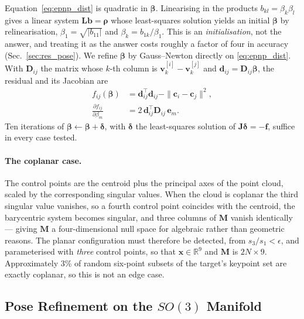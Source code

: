 Equation~\eqref{eq:epnp_dist} is quadratic in $\boldsymbol{\beta}$.
Linearising in the products $b_{kl} = \beta_k \beta_l$ gives a linear system
$\mathbf{L}\mathbf{b} = \boldsymbol{\rho}$ whose least-squares solution yields
an initial $\boldsymbol{\beta}$ by relinearisation,
$\beta_1 = \sqrt{|b_{11}|}$ and $\beta_k = b_{1k}/\beta_1$. This is an
\emph{initialisation}, not the answer, and treating it as the answer costs
roughly a factor of four in accuracy (Sec.~\ref{sec:res_pose}). We refine
$\boldsymbol{\beta}$ by Gauss--Newton directly on \eqref{eq:epnp_dist}. With
$\mathbf{D}_{ij}$ the matrix whose $k$-th column is
$\mathbf{v}_k^{[i]} - \mathbf{v}_k^{[j]}$ and
$\mathbf{d}_{ij} = \mathbf{D}_{ij}\boldsymbol{\beta}$, the residual and its
Jacobian are
\begin{align}
f_{ij}(\boldsymbol{\beta}) &= \mathbf{d}_{ij}^{\top}\mathbf{d}_{ij}
                              - \|\mathbf{c}_i - \mathbf{c}_j\|^2 ,
\label{eq:epnp_resid}\\
\frac{\partial f_{ij}}{\partial \beta_m}
  &= 2\, \mathbf{d}_{ij}^{\top} \mathbf{D}_{ij}\,\mathbf{e}_m .
\label{eq:epnp_jac}
\end{align}
Ten iterations of $\boldsymbol{\beta} \leftarrow \boldsymbol{\beta} +
\boldsymbol{\delta}$, with $\boldsymbol{\delta}$ the least-squares solution of
$\mathbf{J}\boldsymbol{\delta} = -\mathbf{f}$, suffice in every case tested.

\paragraph{The coplanar case.}
The control points are the centroid plus the principal axes of the point
cloud, scaled by the corresponding singular values. When the cloud is
coplanar the third singular value vanishes, so a fourth control point
coincides with the centroid, the barycentric system becomes singular, and
three columns of $\mathbf{M}$ vanish identically --- giving $\mathbf{M}$ a
four-dimensional null space for algebraic rather than geometric reasons. The
planar configuration must therefore be detected, from $s_3 / s_1 < \epsilon$,
and parameterised with \emph{three} control points, so that
$\mathbf{x} \in \mathbb{R}^{9}$ and $\mathbf{M}$ is $2N \times 9$.
Approximately 3\% of random six-point subsets of the target's keypoint set
are exactly coplanar, so this is not an edge case.

\subsection{Pose Refinement on the $SO(3)$ Manifold}
\label{sec:pnp_manifold}

